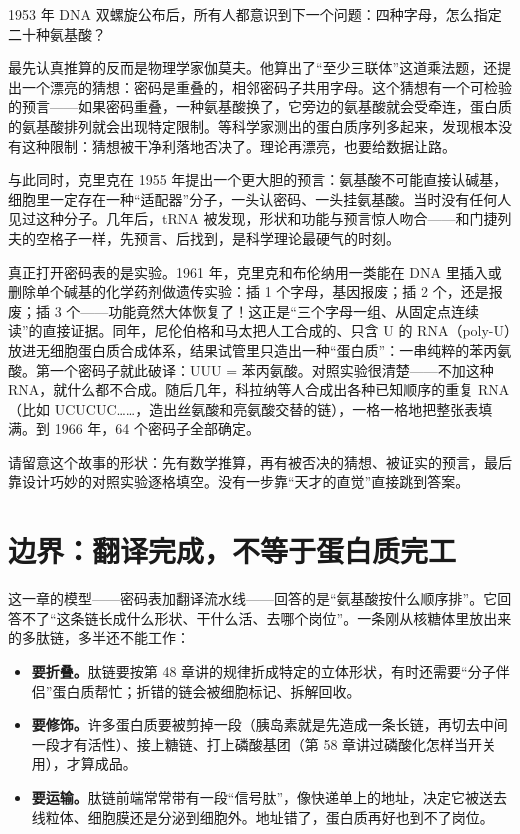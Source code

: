 \begin{zhengju}
1953 年 DNA 双螺旋公布后，所有人都意识到下一个问题：四种字母，怎么指定二十种氨基酸？

最先认真推算的反而是物理学家伽莫夫。他算出了“至少三联体”这道乘法题，还提出一个漂亮的猜想：密码是重叠的，相邻密码子共用字母。这个猜想有一个可检验的预言——如果密码重叠，一种氨基酸换了，它旁边的氨基酸就会受牵连，蛋白质的氨基酸排列就会出现特定限制。等科学家测出的蛋白质序列多起来，发现根本没有这种限制：猜想被干净利落地否决了。理论再漂亮，也要给数据让路。

与此同时，克里克在 1955 年提出一个更大胆的预言：氨基酸不可能直接认碱基，细胞里一定存在一种“适配器”分子，一头认密码、一头挂氨基酸。当时没有任何人见过这种分子。几年后，tRNA 被发现，形状和功能与预言惊人吻合——和门捷列夫的空格子一样，先预言、后找到，是科学理论最硬气的时刻。

真正打开密码表的是实验。1961 年，克里克和布伦纳用一类能在 DNA 里插入或删除单个碱基的化学药剂做遗传实验：插 1 个字母，基因报废；插 2 个，还是报废；插 3 个——功能竟然大体恢复了！这正是“三个字母一组、从固定点连续读”的直接证据。同年，尼伦伯格和马太把人工合成的、只含 U 的 RNA（poly-U）放进无细胞蛋白质合成体系，结果试管里只造出一种“蛋白质”：一串纯粹的苯丙氨酸。第一个密码子就此破译：UUU = 苯丙氨酸。对照实验很清楚——不加这种 RNA，就什么都不合成。随后几年，科拉纳等人合成出各种已知顺序的重复 RNA（比如 UCUCUC……，造出丝氨酸和亮氨酸交替的链），一格一格地把整张表填满。到 1966 年，64 个密码子全部确定。

请留意这个故事的形状：先有数学推算，再有被否决的猜想、被证实的预言，最后靠设计巧妙的对照实验逐格填空。没有一步靠“天才的直觉”直接跳到答案。
\end{zhengju}

\section{边界：翻译完成，不等于蛋白质完工}

这一章的模型——密码表加翻译流水线——回答的是“氨基酸按什么顺序排”。它回答不了“这条链长成什么形状、干什么活、去哪个岗位”。一条刚从核糖体里放出来的多肽链，多半还不能工作：

\begin{itemize}[itemsep=2pt]
\item \textbf{要折叠。}肽链要按第 48 章讲的规律折成特定的立体形状，有时还需要“分子伴侣”蛋白质帮忙；折错的链会被细胞标记、拆解回收。
\item \textbf{要修饰。}许多蛋白质要被剪掉一段（胰岛素就是先造成一条长链，再切去中间一段才有活性）、接上糖链、打上磷酸基团（第 58 章讲过磷酸化怎样当开关用），才算成品。
\item \textbf{要运输。}肽链前端常常带有一段“信号肽”，像快递单上的地址，决定它被送去线粒体、细胞膜还是分泌到细胞外。地址错了，蛋白质再好也到不了岗位。
\end{itemize}

